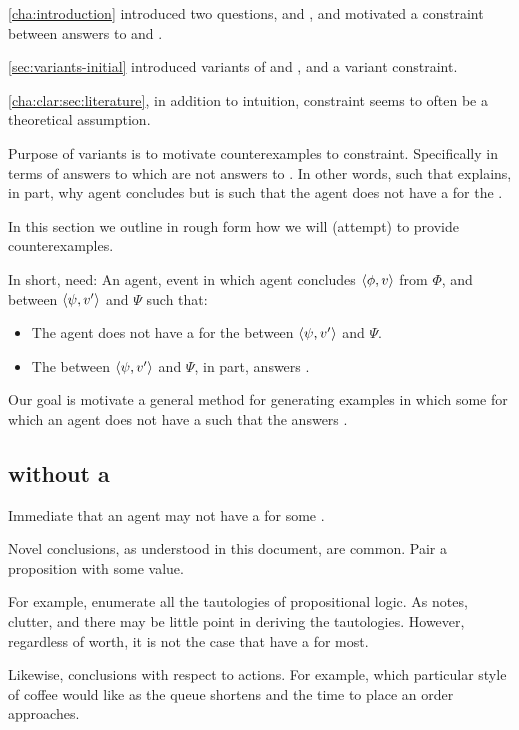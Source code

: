 \begin{note}
  \autoref{cha:introduction} introduced two questions, \qWhy{} and \qHow{}, and motivated a constraint between answers to \qWhy{} and \qHow{}.

  \autoref{sec:variants-initial} introduced variants of \qWhy{} and \qHow{}, and a variant constraint.

  \autoref{cha:clar:sec:literature}, in addition to intuition, constraint seems to often be a theoretical assumption.

  Purpose of variants is to motivate counterexamples to constraint.
  Specifically in terms of answers to \qWhyVnP{} which are not answers to \qHowV{}.
  In other words, \ros{} such that \ros{} explains, in part, why agent concludes but is such that the agent does not have a \wit{} for the \ros{}.

  In this section we outline in rough form how we will (attempt) to provide counterexamples.

  In short, need:
  An agent, event in which agent concludes \(\langle \phi, v \rangle\) from \(\Phi\), and \ros{} between \(\langle \psi, v' \rangle\) and \(\Psi\) such that:

  \begin{itemize}
  \item
    The agent does not have a \wit{} for the \ros{} between \(\langle \psi, v' \rangle\) and \(\Psi\).
  \item
    The \ros{} between \(\langle \psi, v' \rangle\) and \(\Psi\), in part, answers \qWhyVnP{}.
  \end{itemize}

  Our goal is motivate a general method for generating examples in which some \ros{} for which an agent does not have a \wit{} such that the \ros{} answers \qWhyVnP{}.
\end{note}

\subsection{ without a \wit{}}

\begin{note}
  Immediate that an agent may not have a \wit{} for some \ros{}.

  Novel conclusions, as understood in this document, are common.
  Pair a proposition with some value.

  For example, enumerate all the tautologies of propositional logic.
  As \citeauthor{Harman:1973ww} notes, clutter, and there may be little point in deriving the tautologies.
  However, regardless of worth, it is not the case that have a \wit{} for most.

  Likewise, conclusions with respect to actions.
  For example, which particular style of coffee would like as the queue shortens and the time to place an order approaches.
\end{note}


